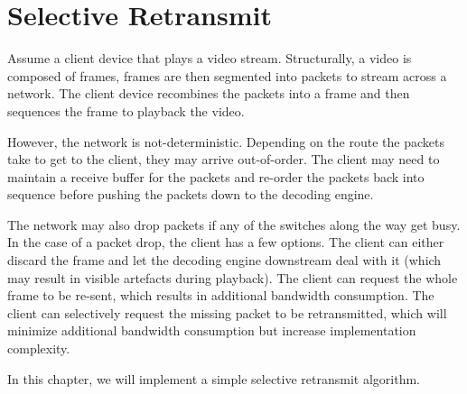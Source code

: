 
% 

\chapter{Selective Retransmit}

Assume a client device that plays a video stream. Structurally, a video is
composed of frames, frames are then segmented into packets to stream across a
network. The client device recombines the packets into a frame and then sequences the frame to playback the video.\newline

However, the network is not-deterministic. Depending on the route the packets take
to get to the client, they may arrive out-of-order. The client may need to
maintain a receive buffer for the packets and re-order the packets back into
sequence before pushing the packets down to the decoding engine.\newline

The network may also drop packets if any of the switches along the way get busy.
In the case of a packet drop, the client has a few options. The client can
either discard the frame and let the decoding engine downstream deal with it
(which may result in visible artefacts during playback). The client can request
the whole frame to be re-sent, which results in additional bandwidth
consumption.  The client can selectively request the missing packet to be
retransmitted, which will minimize additional bandwidth consumption but increase
implementation complexity.\newline

In this chapter, we will implement a simple selective retransmit
algorithm.\newline

